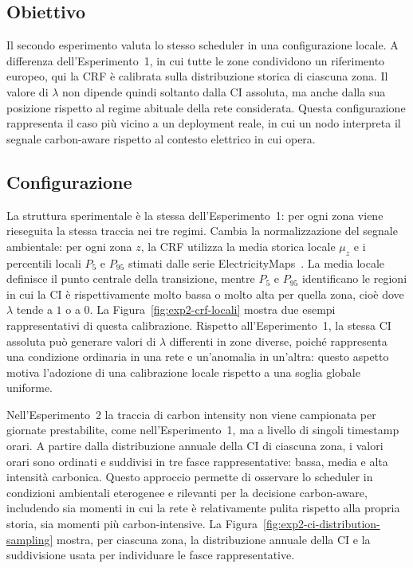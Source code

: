 \subsection{Obiettivo}
\label{subsec:esperimento2-obiettivo}

Il secondo esperimento valuta lo stesso scheduler in una configurazione
locale. A differenza dell'Esperimento~1, in cui tutte le zone condividono
un riferimento europeo, qui la CRF è calibrata sulla distribuzione
storica di ciascuna zona. Il valore di $\lambda$ non dipende quindi
soltanto dalla CI assoluta, ma anche dalla sua posizione rispetto al regime
abituale della rete considerata. Questa configurazione rappresenta il caso
più vicino a un deployment reale, in cui un nodo interpreta il segnale
carbon-aware rispetto al contesto elettrico in cui opera.

\subsection{Configurazione}
\label{subsec:esperimento2-configurazione}

La struttura sperimentale è la stessa dell'Esperimento~1: per ogni zona
viene rieseguita la stessa traccia nei tre regimi. Cambia la
normalizzazione del segnale ambientale: per ogni zona $z$, la CRF
utilizza la media storica locale $\mu_z$ e i percentili locali $P_5$ e
$P_{95}$ stimati dalle serie ElectricityMaps~\cite{electricitymaps2024}.
La media locale definisce il punto centrale della transizione, mentre
$P_5$ e $P_{95}$ identificano le regioni in cui la CI è rispettivamente
molto bassa o molto alta per quella zona, cioè dove $\lambda$ tende a
$1$ o a $0$. La Figura~\ref{fig:exp2-crf-locali} mostra due esempi
rappresentativi di questa calibrazione.
Rispetto all'Esperimento~1, la stessa CI assoluta può generare valori di $\lambda$ differenti in zone
diverse, poiché rappresenta una condizione ordinaria in una rete e
un'anomalia in un'altra: questo aspetto motiva l'adozione di una
calibrazione locale rispetto a una soglia globale uniforme.

Nell'Esperimento~2 la traccia di carbon intensity non viene campionata per
giornate prestabilite, come nell'Esperimento~1, ma a livello di singoli
timestamp orari. A partire dalla distribuzione annuale della CI di ciascuna
zona, i valori orari sono ordinati e suddivisi in tre fasce
rappresentative: bassa, media e alta intensità carbonica. Questo approccio
permette di osservare lo scheduler in condizioni ambientali eterogenee e
rilevanti per la decisione carbon-aware, includendo sia momenti in cui la
rete è relativamente pulita rispetto alla propria storia, sia momenti più
carbon-intensive. La Figura~\ref{fig:exp2-ci-distribution-sampling}
mostra, per ciascuna zona, la distribuzione annuale della CI e la
suddivisione usata per individuare le fasce rappresentative. 

